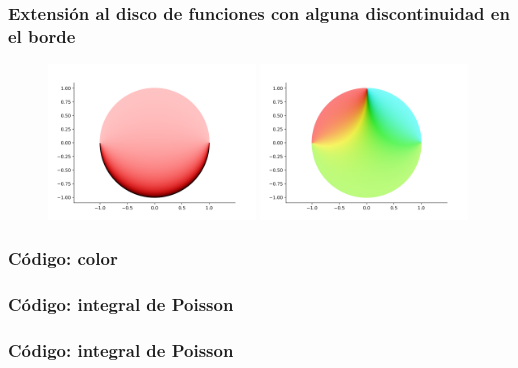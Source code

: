 \documentclass[spanish, a4paper, 12pt, final, slideColor, nototal, colorBG, pdf, noaccumulate, darkblue]{beamer}
\begin{document}
\begin{frame}
    \frametitle{Extensión al disco de funciones con alguna discontinuidad en el borde}
    \begin{figure}[!htbp]
        \centering
        \includegraphics[width=0.49\textwidth]{../Aplicacion/atrozos.png}
        \hfil
        \includegraphics[width=0.49\textwidth]{../Aplicacion/atrozos(2).png}
        \label{fig:atrozos}
    \end{figure}
\end{frame}

\begin{frame}
    \frametitle{Código: color}
    
\end{frame}

\begin{frame}
    \frametitle{Código: integral de Poisson}
    
\end{frame}

\begin{frame}
    \frametitle{Código: integral de Poisson}
    
\end{frame}
\end{document}
